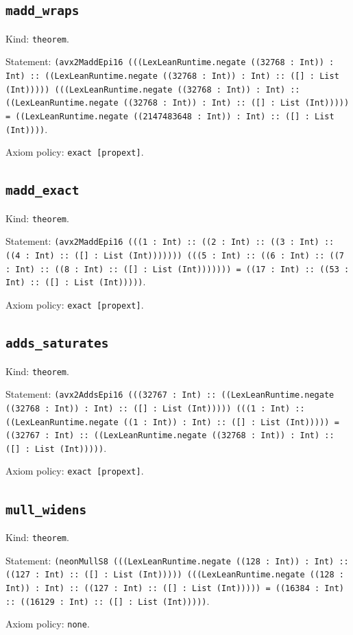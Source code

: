 \documentclass[11pt]{article}
\begin{document}
\subsection*{\texttt{madd\_wraps}}
\noindent Kind: \texttt{theorem}.\par
\noindent Statement: \texttt{(avx2MaddEpi16 (((LexLeanRuntime.negate ((32768 : Int)) : Int) :: ((LexLeanRuntime.negate ((32768 : Int)) : Int) :: ([] : List (Int))))) (((LexLeanRuntime.negate ((32768 : Int)) : Int) :: ((LexLeanRuntime.negate ((32768 : Int)) : Int) :: ([] : List (Int))))) = ((LexLeanRuntime.negate ((2147483648 : Int)) : Int) :: ([] : List (Int))))}.\par
\noindent Axiom policy: \texttt{exact [propext]}.\par
\subsection*{\texttt{madd\_exact}}
\noindent Kind: \texttt{theorem}.\par
\noindent Statement: \texttt{(avx2MaddEpi16 (((1 : Int) :: ((2 : Int) :: ((3 : Int) :: ((4 : Int) :: ([] : List (Int))))))) (((5 : Int) :: ((6 : Int) :: ((7 : Int) :: ((8 : Int) :: ([] : List (Int))))))) = ((17 : Int) :: ((53 : Int) :: ([] : List (Int)))))}.\par
\noindent Axiom policy: \texttt{exact [propext]}.\par
\subsection*{\texttt{adds\_saturates}}
\noindent Kind: \texttt{theorem}.\par
\noindent Statement: \texttt{(avx2AddsEpi16 (((32767 : Int) :: ((LexLeanRuntime.negate ((32768 : Int)) : Int) :: ([] : List (Int))))) (((1 : Int) :: ((LexLeanRuntime.negate ((1 : Int)) : Int) :: ([] : List (Int))))) = ((32767 : Int) :: ((LexLeanRuntime.negate ((32768 : Int)) : Int) :: ([] : List (Int)))))}.\par
\noindent Axiom policy: \texttt{exact [propext]}.\par
\subsection*{\texttt{mull\_widens}}
\noindent Kind: \texttt{theorem}.\par
\noindent Statement: \texttt{(neonMullS8 (((LexLeanRuntime.negate ((128 : Int)) : Int) :: ((127 : Int) :: ([] : List (Int))))) (((LexLeanRuntime.negate ((128 : Int)) : Int) :: ((127 : Int) :: ([] : List (Int))))) = ((16384 : Int) :: ((16129 : Int) :: ([] : List (Int)))))}.\par
\noindent Axiom policy: \texttt{none}.\par
\end{document}
